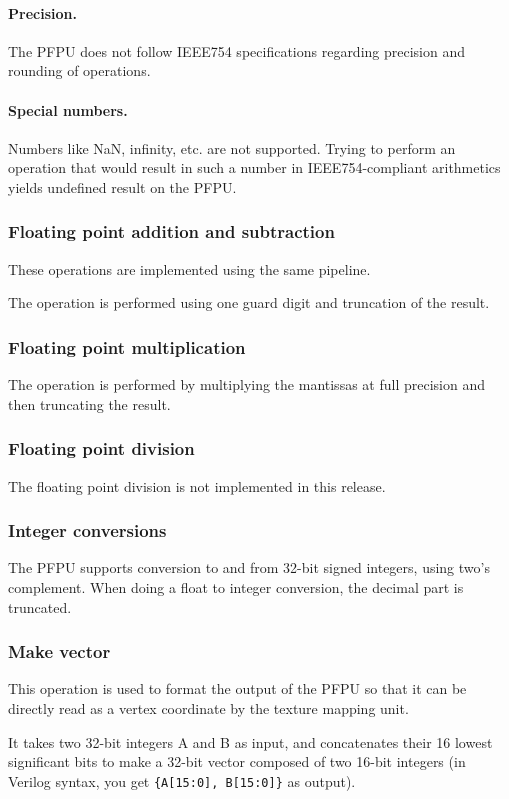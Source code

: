 \documentclass[a4paper,11pt]{article}
\begin{document}
\paragraph{Precision.} The PFPU does not follow IEEE754 specifications regarding precision and rounding of operations.

\paragraph{Special numbers.} Numbers like NaN, infinity, etc. are not supported. Trying to perform an operation that would result in such a number in IEEE754-compliant arithmetics yields undefined result on the PFPU.

\subsubsection{Floating point addition and subtraction}
These operations are implemented using the same pipeline.

The operation is performed using one guard digit and truncation of the result.

\subsubsection{Floating point multiplication}
The operation is performed by multiplying the mantissas at full precision and then truncating the result.

\subsubsection{Floating point division}
The floating point division is not implemented in this release.

\subsubsection{Integer conversions}
The PFPU supports conversion to and from 32-bit signed integers, using two's complement. When doing a float to integer conversion, the decimal part is truncated.

\subsubsection{Make vector}
This operation is used to format the output of the PFPU so that it can be directly read as a vertex coordinate by the texture mapping unit.

It takes two 32-bit integers A and B as input, and concatenates their 16 lowest significant bits to make a 32-bit vector composed of two 16-bit integers (in Verilog syntax, you get \verb!{A[15:0], B[15:0]}! as output).
\end{document}
